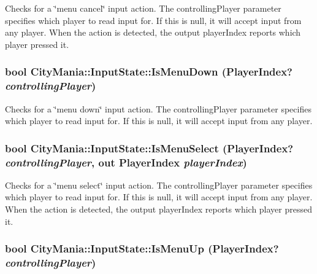 Checks for a \char`\"{}menu cancel\char`\"{} input action. The controllingPlayer parameter specifies which player to read input for. If this is null, it will accept input from any player. When the action is detected, the output playerIndex reports which player pressed it. \hypertarget{classCityMania_1_1InputState_a3c1b0c6bd78fce6777cf3e66b11bab89}{
\subsubsection[{IsMenuDown}]{\setlength{\rightskip}{0pt plus 5cm}bool CityMania::InputState::IsMenuDown (PlayerIndex? {\em controllingPlayer})}}
\label{classCityMania_1_1InputState_a3c1b0c6bd78fce6777cf3e66b11bab89}


Checks for a \char`\"{}menu down\char`\"{} input action. The controllingPlayer parameter specifies which player to read input for. If this is null, it will accept input from any player. \hypertarget{classCityMania_1_1InputState_a35467f4216f2228c1288e738c1db7c4f}{
\subsubsection[{IsMenuSelect}]{\setlength{\rightskip}{0pt plus 5cm}bool CityMania::InputState::IsMenuSelect (PlayerIndex? {\em controllingPlayer}, \/  out PlayerIndex {\em playerIndex})}}
\label{classCityMania_1_1InputState_a35467f4216f2228c1288e738c1db7c4f}


Checks for a \char`\"{}menu select\char`\"{} input action. The controllingPlayer parameter specifies which player to read input for. If this is null, it will accept input from any player. When the action is detected, the output playerIndex reports which player pressed it. \hypertarget{classCityMania_1_1InputState_a8cb3c3fd9a65d6be25674a20a4c472b4}{
\subsubsection[{IsMenuUp}]{\setlength{\rightskip}{0pt plus 5cm}bool CityMania::InputState::IsMenuUp (PlayerIndex? {\em controllingPlayer})}}
\label{classCityMania_1_1InputState_a8cb3c3fd9a65d6be25674a20a4c472b4}



